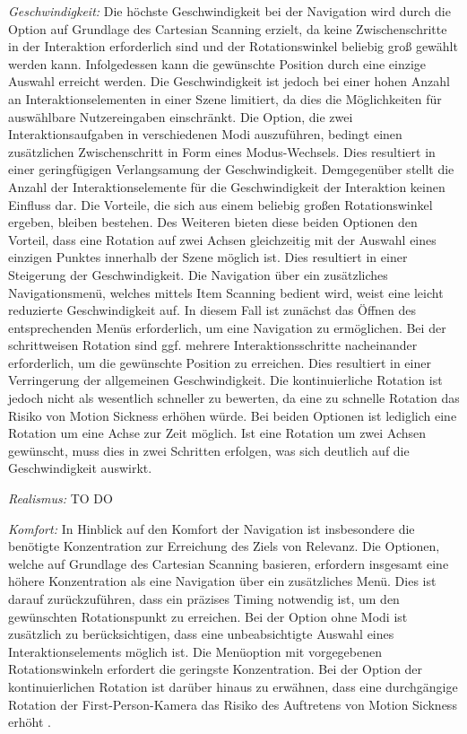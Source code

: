 \textit{Geschwindigkeit:}
Die höchste Geschwindigkeit bei der Navigation wird durch die Option auf Grundlage des Cartesian Scanning erzielt, da keine Zwischenschritte in der Interaktion erforderlich sind und der Rotationswinkel beliebig groß gewählt werden kann. Infolgedessen kann die gewünschte Position durch eine einzige Auswahl erreicht werden. Die Geschwindigkeit ist jedoch bei einer hohen Anzahl an Interaktionselementen in einer Szene limitiert, da dies die Möglichkeiten für auswählbare Nutzereingaben einschränkt. 
Die Option, die zwei Interaktionsaufgaben in verschiedenen Modi auszuführen, bedingt einen zusätzlichen Zwischenschritt in Form eines Modus-Wechsels. Dies resultiert in einer geringfügigen Verlangsamung der Geschwindigkeit. Demgegenüber stellt die Anzahl der Interaktionselemente für die Geschwindigkeit der Interaktion keinen Einfluss dar. Die Vorteile, die sich aus einem beliebig großen Rotationswinkel ergeben, bleiben bestehen.  Des Weiteren bieten diese beiden Optionen den Vorteil, dass eine Rotation auf zwei Achsen gleichzeitig mit der Auswahl eines einzigen Punktes innerhalb der Szene möglich ist. Dies resultiert in einer Steigerung der Geschwindigkeit. 
Die Navigation über ein zusätzliches Navigationsmenü, welches mittels Item Scanning bedient wird, weist eine leicht reduzierte Geschwindigkeit auf. In diesem Fall ist zunächst das Öffnen des entsprechenden Menüs erforderlich, um eine Navigation zu ermöglichen. Bei der schrittweisen Rotation sind ggf. mehrere Interaktionsschritte nacheinander erforderlich, um die gewünschte Position zu erreichen. Dies resultiert in einer Verringerung der allgemeinen Geschwindigkeit. Die kontinuierliche Rotation ist jedoch nicht als wesentlich schneller zu bewerten, da eine zu schnelle Rotation das Risiko von Motion Sickness erhöhen würde. Bei beiden Optionen ist lediglich eine Rotation um eine Achse zur Zeit möglich. Ist eine Rotation um zwei Achsen gewünscht, muss dies in zwei Schritten erfolgen, was sich deutlich auf die Geschwindigkeit auswirkt. 

\textit{Realismus:} TO DO 

\textit{Komfort:}
In Hinblick auf den Komfort der Navigation ist insbesondere die benötigte Konzentration zur Erreichung des Ziels von Relevanz. Die Optionen, welche auf Grundlage des Cartesian Scanning basieren, erfordern insgesamt eine höhere Konzentration als eine Navigation über ein zusätzliches Menü. Dies ist darauf zurückzuführen, dass ein präzises Timing notwendig ist, um den gewünschten Rotationspunkt zu erreichen. Bei der Option ohne Modi ist zusätzlich zu berücksichtigen, dass eine unbeabsichtigte Auswahl eines Interaktionselements möglich ist. Die Menüoption mit vorgegebenen Rotationswinkeln erfordert die geringste Konzentration. Bei der Option der kontinuierlichen Rotation ist darüber hinaus zu erwähnen, dass eine durchgängige Rotation der First-Person-Kamera das Risiko des Auftretens von Motion Sickness erhöht \citep{10.1007/s10055-020-00425-x, 8797722}.

